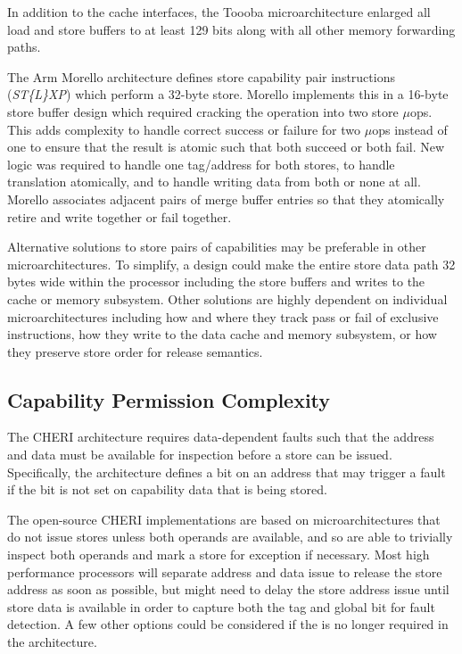 In addition to the cache interfaces, the Toooba microarchitecture enlarged all load and store buffers to at least 129 bits along with all other memory forwarding paths.

The Arm Morello architecture defines store capability pair instructions (\emph{ST\{L\}XP}) which perform a 32-byte store.
Morello implements this in a 16-byte store buffer design which required cracking the operation into two store $\mu$ops.
This adds complexity to handle correct success or failure for two $\mu$ops instead of one to ensure that the result is atomic such that both succeed or both fail.
New logic was required to handle one tag/address for both stores, to handle translation atomically, and to handle writing data from both or none at all.
Morello associates adjacent pairs of merge buffer entries so that they atomically retire and write together or fail together.

Alternative solutions to store pairs of capabilities may be preferable in other microarchitectures.
To simplify, a design could make the entire store data path 32 bytes wide within the processor including the store buffers and writes to the cache or memory subsystem.
Other solutions are highly dependent on individual microarchitectures including how and where they track pass or fail of exclusive instructions, how they write to the data cache and memory subsystem, or how they preserve store order for release semantics.

\subsection{Capability Permission Complexity}
The CHERI architecture requires data-dependent faults such that the address and data must be available for inspection before a store can be issued.
Specifically, the architecture defines a \cappermSLC bit on an address that may trigger a fault if the \cappermG bit is not set on capability data that is being stored.

The open-source CHERI implementations are based on microarchitectures that do not issue stores unless both operands are available, and so are able to trivially inspect both operands and mark a store for exception if necessary.
Most high performance processors will separate address and data issue to release the store address as soon as possible, but might need to delay the store address issue until store data is available in order to capture both the tag and global bit for fault detection.
A few other options could be considered if the \cappermSLC is no longer required in the architecture.

